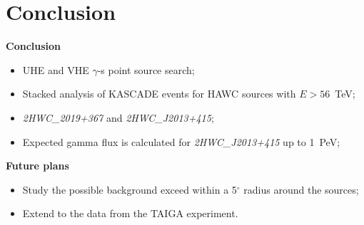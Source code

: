 \section{Conclusion}

\begin{frame}
\textcolor{kit-green100}{\textbf{Conclusion}}
\begin{itemize}
  \item UHE and VHE $\gamma$-s point source search;
  \item Stacked analysis of KASCADE events for HAWC sources with $E > 56$~TeV;
  \item \textit{2HWC\_2019+367} and \textit{2HWC\_J2013+415};
  \item Expected gamma flux is calculated for \textit{2HWC\_J2013+415} up to 1~PeV;



\end{itemize}

\textcolor{kit-green100}{\textbf{Future plans}}
  \begin{itemize}
    \item Study the possible background exceed within a 5$^\circ$ radius around the sources;
    \item Extend to the data from the TAIGA experiment.
  \end{itemize}
\end{frame}

